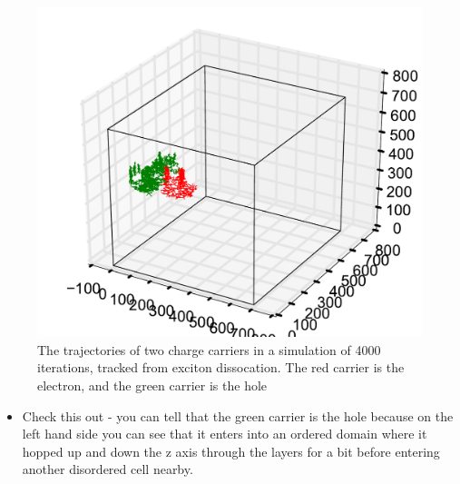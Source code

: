 \documentclass[12pt]{article}
\begin{document}
\begin{figure}[h!]\centering
	\includegraphics[width=\textwidth]{Figures/3d_trajectory.pdf}
    \caption{The trajectories of two charge carriers in a simulation of 4000 iterations, tracked from exciton dissocation. The red carrier is the electron, and the green carrier is the hole}
	\label{fig:3dTrajectory}
\end{figure}


\begin{itemize}
    \item{Check this out - you can tell that the green carrier is the hole because on the left hand side you can see that it enters into an ordered domain where it hopped up and down the z axis through the layers for a bit before entering another disordered cell nearby.}
\end{itemize}

\clearpage



\end{document}
